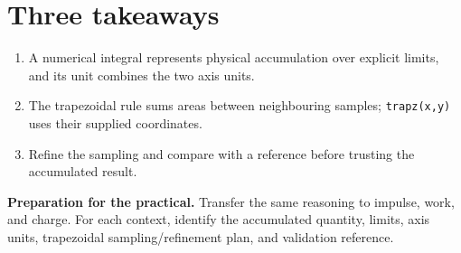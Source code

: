 \documentclass[11pt,a4paper]{article}
\begin{document}
\section*{Three takeaways}
\begin{enumerate}[nosep,leftmargin=6mm]
\item A numerical integral represents physical accumulation over explicit limits, and its unit combines the two axis units.
\item The trapezoidal rule sums areas between neighbouring samples; \texttt{trapz(x,y)} uses their supplied coordinates.
\item Refine the sampling and compare with a reference before trusting the accumulated result.
\end{enumerate}

\begin{keybox}\textbf{Preparation for the practical.} Transfer the same reasoning to impulse, work, and charge. For each context, identify the accumulated quantity, limits, axis units, trapezoidal sampling/refinement plan, and validation reference.\end{keybox}
\end{document}
